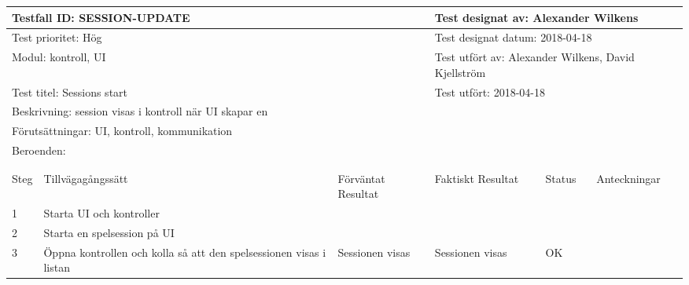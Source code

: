 
\begin{tabular}{| p{1cm}|  p{3cm} | p{3cm}| p{3cm}| p{2cm}| p{3cm}|}
	\hline
	  \multicolumn{3}{|l|}{Testfall ID: SESSION-UPDATE}&\multicolumn{3}{|l|}{Test designat av: Alexander Wilkens}\\
	  \hline
	  \multicolumn{3}{|l|}{Test prioritet: Hög}&\multicolumn{3}{|l|}{Test designat datum: 2018-04-18}\\
	  \hline
	  \multicolumn{3}{|l|}{Modul: kontroll, UI}&\multicolumn{3}{|l|}{Test utfört av: Alexander Wilkens, David Kjellström}\\
	  \hline
	  \multicolumn{3}{|l|}{Test titel: Sessions start}&\multicolumn{3}{|l|}{Test utfört: 2018-04-18}\\
	  \hline
	  \multicolumn{6}{|p{\textwidth}|}{Beskrivning: session visas i kontroll när UI skapar en}\\
	  \hline
	  \multicolumn{6}{|p{\textwidth}|}{Förutsättningar: UI, kontroll, kommunikation}\\
	  \hline
	  \multicolumn{6}{|p{\textwidth}|}{Beroenden: }\\
  
	\hline
	\multicolumn{6}{|l|}{}\\
	\multicolumn{6}{|l|}{}\\
      	\hline
	Steg&Tillvägagångssätt&Förväntat Resultat&Faktiskt Resultat&Status&Anteckningar \\
	\hline
	1&Starta UI och kontroller&&&&\\
      	\hline
	2&Starta en spelsession på UI&&&&\\
      	\hline
	3&Öppna kontrollen och kolla så att den spelsessionen visas i listan&Sessionen visas&Sessionen visas&OK&\\
      	\hline
\end{tabular}



